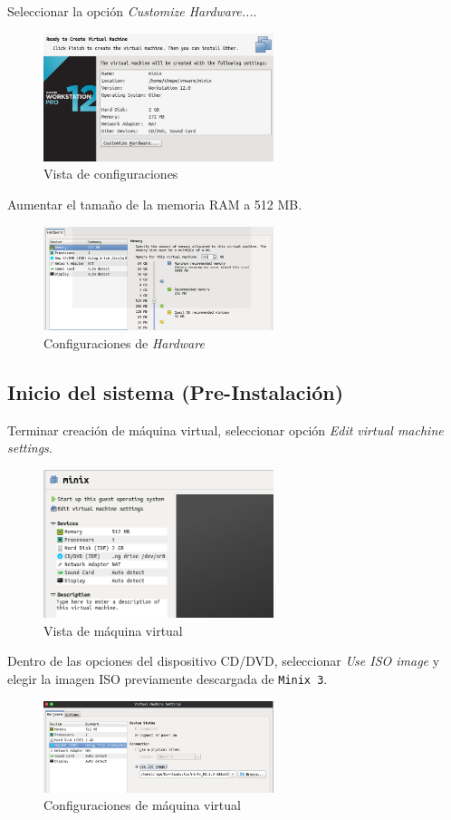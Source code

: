 \documentclass[12pt]{scrartcl}
\begin{document}
Seleccionar la opción \textit{Customize Hardware...}.
\begin{figure}[H]
  \centering
  \includegraphics[width=0.6\textwidth]{vm/min10.png}
  \caption{Vista de configuraciones}
\end{figure}

Aumentar el tamaño de la memoria RAM a 512 MB.
\begin{figure}[H]
  \centering
  \includegraphics[width=0.6\textwidth]{vm/min11.png}
  \caption{Configuraciones de \textit{Hardware}}
\end{figure}

\subsection{Inicio del sistema (Pre-Instalación)}
Terminar creación de máquina virtual, seleccionar opción \textit{Edit virtual machine settings}.
\begin{figure}[H]
  \centering
  \includegraphics[width=0.6\textwidth]{vm/min13.png}
  \caption{Vista de máquina virtual}
\end{figure}

Dentro de las opciones del dispositivo CD/DVD, seleccionar \textit{Use ISO image} y elegir la imagen ISO previamente descargada de \texttt{Minix 3}.
\begin{figure}[H]
  \centering
  \includegraphics[width=0.6\textwidth]{vm/min14.png}
  \caption{Configuraciones de máquina virtual}
\end{figure}
\end{document}
